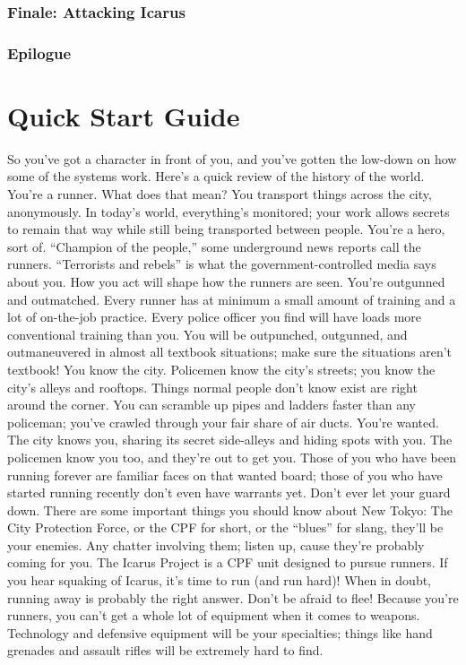 \documentclass{article}
\begin{document}
\subsubsection{Finale: Attacking Icarus}
\subsubsection{Epilogue}
\section{Quick Start Guide}
So you’ve got a character in front of you, and you’ve gotten the low-down on how some of the systems work. Here’s a quick review of the history of the world.
You’re a runner. What does that mean? You transport things across the city, anonymously. In today’s world, everything’s monitored; your work allows secrets to remain that way while still being transported between people.
You’re a hero, sort of. “Champion of the people,” some underground news reports call the runners. “Terrorists and rebels” is what the government-controlled media says about you. How you act will shape how the runners are seen.
You’re outgunned and outmatched. Every runner has at minimum a small amount of training and a lot of on-the-job practice. Every police officer you find will have loads more conventional training than you. You will be outpunched, outgunned, and outmaneuvered in almost all textbook situations; make sure the situations aren’t textbook!
You know the city. Policemen know the city’s streets; you know the city’s alleys and rooftops. Things normal people don’t know exist are right around the corner. You can scramble up pipes and ladders faster than any policeman; you’ve crawled through your fair share of air ducts.
You’re wanted. The city knows you, sharing its secret side-alleys and hiding spots with you. The policemen know you too, and they’re out to get you. Those of you who have been running forever are familiar faces on that wanted board; those of you who have started running recently don’t even have warrants yet. Don’t ever let your guard down.
There are some important things you should know about New Tokyo:
The City Protection Force, or the CPF for short, or the “blues” for slang, they’ll be your enemies. Any chatter involving them; listen up, cause they’re probably coming for you.
The Icarus Project is a CPF unit designed to pursue runners. If you hear squaking of Icarus, it’s time to run (and run hard)!
When in doubt, running away is probably the right answer. Don’t be afraid to flee!
Because you’re runners, you can’t get a whole lot of equipment when it comes to weapons. Technology and defensive equipment will be your specialties; things like hand grenades and assault rifles will be extremely hard to find.
\end{document}
